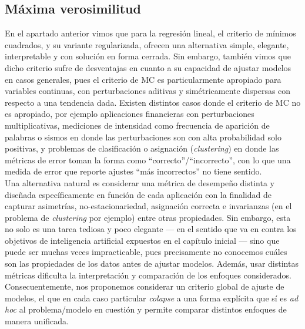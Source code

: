 \subsection{Máxima verosimilitud}
\label{sub:max_ver}

En el apartado anterior vimos que para la regresión lineal, el criterio de  mínimos cuadrados, y su variante regularizada, ofrecen una alternativa simple, elegante, interpretable y con solución en forma cerrada. Sin embargo, también vimos que dicho criterio sufre de desventajas en cuanto a su capacidad de ajustar modelos en casos generales, pues el criterio de MC es particularmente apropiado para variables continuas, con perturbaciones aditivas  y simétricamente dispersas con respecto a una tendencia dada. Existen distintos casos donde el criterio de MC no es apropiado, por ejemplo aplicaciones financieras con  perturbaciones multiplicativas, mediciones de intensidad como frecuencia de aparición de palabras o sismos en donde las perturbaciones son con alta probabilidad solo positivas, y problemas de clasificación o asignación (\emph{clustering}) en donde las métricas de error toman la forma como ``correcto''/``incorrecto'', con lo que una medida de error que reporte ajustes ``más incorrectos'' no tiene sentido. \\

Una alternativa natural es considerar una métrica de desempeño distinta y diseñada específicamente en función  de cada aplicación con la finalidad de capturar asimetrías, no-estacionariedad, asignación correcta e invarianzas (en el problema de \emph{clustering} por ejemplo) entre otras propiedades. Sin embargo, esta no solo es una tarea tediosa y poco elegante --- en el sentido que va en contra los objetivos de inteligencia artificial expuestos en el capítulo inicial --- sino que puede ser muchas veces impracticable, pues precisamente no conocemos cuáles son las propiedades de los datos antes de ajustar modelos. Además, usar distintas métricas dificulta la interpretación y comparación de los enfoques considerados. Consecuentemente, nos proponemos considerar un criterio global de ajuste de modelos, el que en cada caso particular \emph{colapse} a una forma explícita que sí es \emph{ad hoc} al problema/modelo en cuestión y permite comparar distintos enfoques de manera unificada.\\

